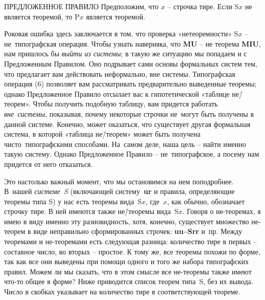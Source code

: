 \documentclass[../main.tex]{subfiles}
\begin{document}
\begin{mybox}{ПРЕДЛОЖЕННОЕ ПРАВИЛО}
    Предположим, что $x$ \--- строчка тире.
    Если S$x$ не является теоремой, то P$x$ является теоремой.
\end{mybox}

Роковая ошибка здесь заключается в том, что проверка «нетеоремности» S$x$ \--- не~типографская операция. Чтобы узнать наверняка, что \textbf{MU} \--- не теорема \textbf{MIU}, нам пришлось бы \emph{выйти из системы}; в такую же ситуацию мы попадаем и с Предложенным Правилом. Оно подрывает сами основы формальных систем тем, что предлагает вам действовать неформально, вне системы. Типографская операция (6) позволяет вам рассматривать предварительно выведенные теоремы; однако Предложенное Правило отсылает вас к гипотетической «таблице не\=/теорем». Чтобы получить подобную таблицу, вам придется работать \emph{вне~системы}, показывая, почему некоторые строчки не~могут быть получены в данной системе. Конечно, может оказаться, что существует другая формальная система, в которой «таблица не\=/теорем» может быть получена чисто~типографскими способами. На~самом деле, наша цель \--- найти именно такую систему. Однако Предложенное Правило \--- не~типографское, а посему нам придется от него отказаться.

Это настолько важный момент, что мы остановимся на нем поподробнее. В~нашей \emph{системе~S} (включающей систему~\textbf{ur} и правила, определяющие теоремы типа S) у нас есть теоремы вида~S$x$, где~$x$, как обычно, обозначает строчку тире. В ней имеются также не\=/теоремы вида~S$x$. Говоря о не-теоремах, я имею в виду именно эту разновидность, хотя, конечно, существует множество не-теорем в виде неправильно сформированных строчек: \textbf{uu--Srr} и~пр. Между теоремами и не-теоремами есть следующая разница: количество тире в первых \--- составное число, во вторых \--- простое. К тому же, все теоремы похожи по форме, так как все они выведены при помощи одного и того же набора типографских правил. Можем ли мы сказать, что в этом смысле все не-теоремы также имеют что-то общее в форме? Ниже приводится список теорем типа~S, без их вывода. Число в скобках указывает на количество тире в соответствующей теореме.
\end{document}

